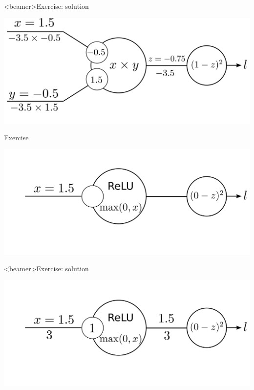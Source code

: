 \documentclass[xcolor=pdftex,dvipsnames,table,mathserif]{beamer}
\begin{document}
\begin{frame}<beamer>{Exercise: solution}

\includegraphics[width=\textwidth]{bp_2_1_neuron_exo_sol.png}

\end{frame}



\begin{frame}{Exercise}

\includegraphics[width=\textwidth]{bp_relu_exo.png}

\end{frame}

\begin{frame}<beamer>{Exercise: solution}

\includegraphics[width=\textwidth]{bp_relu_exo_sol.png}

\end{frame}
\end{document}
